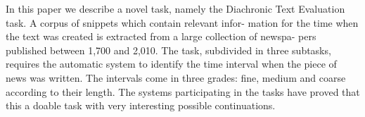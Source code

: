 In this paper we describe a novel task, namely the Diachronic Text Evaluation task. A corpus of snippets which contain relevant infor- mation for the time when the text was created is extracted from a large collection of newspa- pers published between 1,700 and 2,010. The task, subdivided in three subtasks, requires the automatic system to identify the time interval when the piece of news was written. The intervals come in three grades: fine, medium and coarse according to their length. The systems participating in the tasks have proved that this a doable task with very interesting possible continuations.

